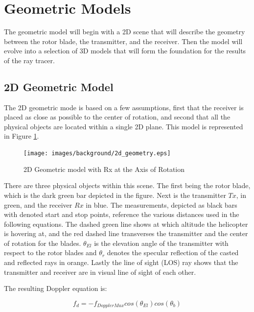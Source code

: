 \section{Geometric Models}
The geometric model will begin with a 2D scene that will describe the geometry between the rotor blade, the transmitter, and the receiver. Then the model will evolve into a selection of 3D models that will form the foundation for the results of the ray tracer.

\subsection{2D Geometric Model}
The 2D geometric mode is based on a few assumptions, first that the receiver is placed as close as possible to the center of rotation, and second that all the physical objects are located within a single 2D plane. This model is represented in Figure \ref{fig:2D_model}.

\begin{figure}[h]
	\begin{center}
		\texttt{[image: images/background/2d\_geometry.eps]}
		\caption{2D Geometric model with Rx at the Axis of Rotation}
		\label{fig:2D_model}
	\end{center}
\end{figure}

There are three physical objects within this scene. The first being the rotor blade, which is the dark green bar depicted in the figure. Next is the transmitter $Tx$, in green, and the receiver $Rx$ in blue. The measurements, depicted as black bars with denoted start and stop points, reference the various distances used in the following equations. The dashed green line shows at which altitude the helicopter is hovering at, and the red dashed line transverses the transmitter and the center of rotation for the blades. $\theta_{El}$ is the elevation angle of the transmitter with respect to the rotor blades and $\theta_r$ denotes the specular reflection of the casted and reflected rays in orange. Lastly the line of sight (LOS) ray shows that the transmitter and receiver are in visual line of sight of each other.

The resulting Doppler equation is:

\begin{equation}
	f_d = -f_{DopplerMax}cos(\theta_{El})cos(\theta_{b})
	\label{eq:dop_theory_blade}
\end{equation}

